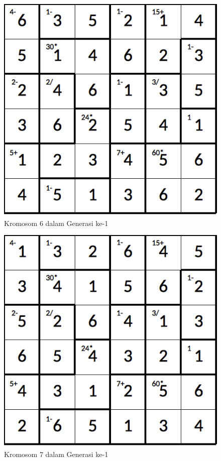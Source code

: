 \begin{figure}
\centering
\captionsetup{justification=centering}
\includegraphics[scale=0.333]{Gambar/hybridgenetic/Generation1Chromosome6}
\caption[Kromosom 6 dalam Generasi ke-1]{Kromosom 6 dalam Generasi ke-1}
\label{fig:analisisg1k6}
\end{figure}

\begin{figure}
\centering
\captionsetup{justification=centering}
\includegraphics[scale=0.333]{Gambar/hybridgenetic/Generation1Chromosome7}
\caption[Kromosom 7 dalam Generasi ke-1]{Kromosom 7 dalam Generasi ke-1}
\label{fig:analisisg1k7}
\end{figure}

